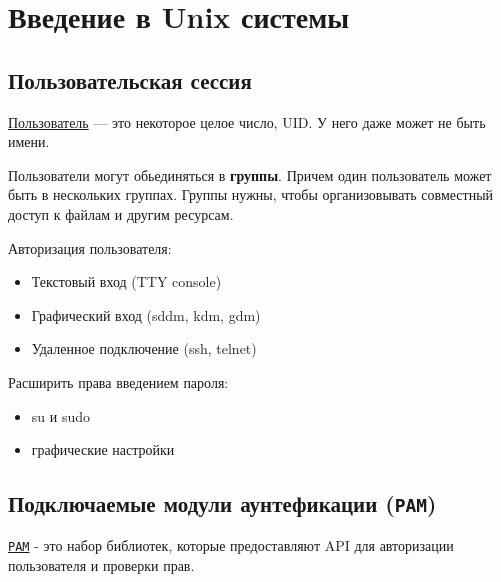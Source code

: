 \section{Введение в Unix системы}

\subsection{Пользовательская сессия}

\begin{Def}
	\underline{Пользователь} --- это некоторое целое число, UID. У него даже может не быть имени.
\end{Def}

Пользователи могут обьединяться в \textbf{группы}. Причем один пользователь может быть в нескольких группах. Группы нужны, чтобы организовывать совместный доступ к файлам и другим ресурсам.

Авторизация пользователя:
\begin{itemize}
	\item Текстовый вход (TTY console)
    \item Графический вход (sddm, kdm, gdm)
    \item Удаленное подключение (ssh, telnet)
\end{itemize}


Расширить права введением пароля:
\begin{itemize}
	\item su и sudo
	\item графические настройки
\end{itemize}


\subsection{Подключаемые модули аунтефикации (\texttt{PAM})}

\begin{Def}
	\underline{\texttt{PAM}} - это набор библиотек, которые предоставляют API для авторизации пользователя и
	проверки прав.
\end{Def}


